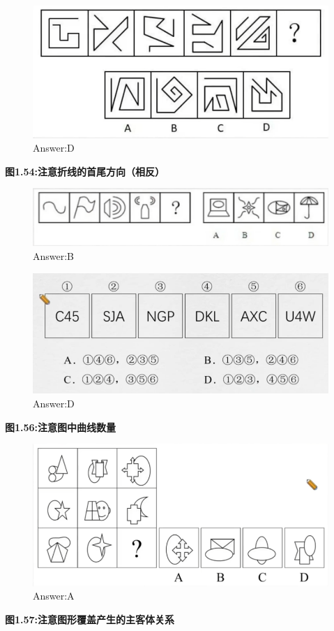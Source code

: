 \documentclass{article}
\numberwithin{equation}{section}						%
\numberwithin{figure}{section}							%
\begin{document}
\begin{sloppypar}
\begin{figure}[H]
     \centering
     \includegraphics[width=0.6\linewidth]{57.png}
		\caption{Answer:D}
\end{figure}

\textbf{图1.54:注意折线的首尾方向（相反）}


\begin{figure}[H]
     \centering
     \includegraphics[width=0.75\linewidth]{58.png}
		\caption{Answer:B}
\end{figure}


\begin{figure}[H]
     \centering
     \includegraphics[width=0.6\linewidth]{59.png}
		\caption{Answer:D}
\end{figure}

\textbf{图1.56:注意图中曲线数量}


\begin{figure}[H]
     \centering
     \includegraphics[width=0.6\linewidth]{60.png}
		\caption{Answer:A}
\end{figure}


\textbf{图1.57:注意图形覆盖产生的主客体关系}



\end{sloppypar}
\end{document}
